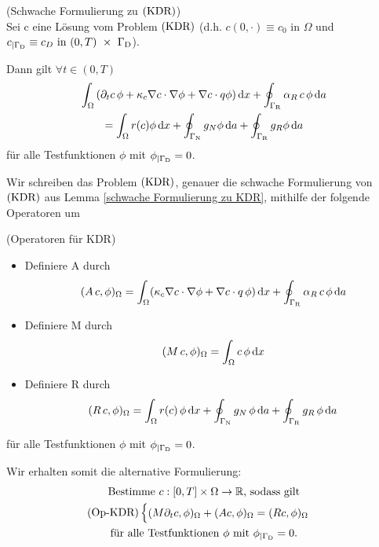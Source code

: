 \begin{Lemma} \label{schwache Formulierung zu KDR}
	(Schwache Formulierung zu $ \operatorname{(KDR)} $)\\
	Sei c eine Lösung vom Problem $ \operatorname{(KDR)} $ (d.h. $ c(0,\cdot) \equiv c_0 \text{ in } \Omega $ und $ c_{|\Gamma_{\text{D}}} \equiv c_D \text{ in } (0,T)~\times~\Gamma_{\text{D}} $).
	
	Dann gilt $ \forall t \in (0,T) $
	\begin{gather*}
		\int_\Omega \left( \partial_t c \, \phi + \kappa_c \nabla c \cdot \nabla \phi + \nabla c \cdot q \phi \right) \mathop{}\!\mathrm{d} x + \oint_{\Gamma_{\text{R}}} \alpha_R \, c \, \phi \mathop{}\!\mathrm{d} a\\ = \int_\Omega r(c) \phi \mathop{}\!\mathrm{d} x + \oint_{\Gamma_{\text{N}}} g_N \phi \mathop{}\!\mathrm{d} a + \oint_{\Gamma_{\text{R}}} g_R \phi \mathop{}\!\mathrm{d} a
	\end{gather*}
	für alle Testfunktionen $ \phi $  mit $ \phi_{|\Gamma_{\text{D}}} = 0 $.
\end{Lemma}

Wir schreiben das Problem $ \operatorname{(KDR)} $, genauer die schwache Formulierung von $ \operatorname{(KDR)} $ aus Lemma \ref{schwache Formulierung zu KDR}, mithilfe der folgende Operatoren um
\begin{define}(Operatoren für KDR)
	\begin{itemize}
		\item Definiere A durch
		\[ (A\, c , \phi)_\Omega = \int_\Omega (\kappa_c \nabla c \cdot \nabla \phi + \nabla c \cdot q \, \phi ) \mathop{}\!\mathrm{d} x + \oint_{\Gamma_{\text{R}}} \alpha_R \, c \, \phi \mathop{}\!\mathrm{d} a  \]
		\item Definiere M durch
		\[ (M \, c, \phi)_\Omega = \int_\Omega c \, \phi \mathop{}\!\mathrm{d} x \]
		\item Definiere R durch
		\[ (R\, c, \phi)_\Omega = \int_\Omega r(c) \, \phi \mathop{}\!\mathrm{d} x + \oint_{\Gamma_{\text{N}}} g_N \, \phi \mathop{}\!\mathrm{d} a + \oint_{\Gamma_{\text{R}}} g_R \, \phi \mathop{}\!\mathrm{d} a \]
	\end{itemize}
	für alle Testfunktionen $ \phi $ mit $ \phi_{|\Gamma_{\text{D}}} = 0 $.
\end{define}

Wir erhalten somit die alternative Formulierung:
\begin{gather*}
	\text{Bestimme } c:[0,T] \times \Omega \to \mathbb{R} \text{, sodass gilt}\\
	\operatorname{(Op-KDR)}\begin{cases}
		(M \partial_t c, \phi)_\Omega + (A c, \phi)_\Omega = (R c, \phi)_\Omega 
	\end{cases}\\
	\text{für alle Testfunktionen } \phi \text{ mit } \phi_{|\Gamma_{\text{D}}} = 0.
\end{gather*}

